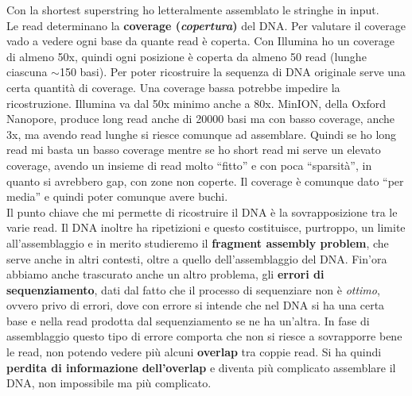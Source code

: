 \documentclass[a4paper,12pt, oneside]{book}
\begin{document}
Con la shortest superstring ho letteralmente assemblato le stringhe in input.\\
Le read determinano la \textbf{coverage (\textit{copertura})} del DNA. Per
valutare il coverage vado a vedere ogni base da quante read è coperta. Con
Illumina ho un coverage di almeno 50x, quindi ogni posizione è coperta da almeno
50 read (lunghe ciascuna $\sim$150 basi). Per poter ricostruire la sequenza di
DNA originale serve una certa quantità di coverage. Una coverage bassa potrebbe
impedire la ricostruzione. Illumina va dal 50x minimo anche a 80x.
MinION, della Oxford Nanopore, produce long read anche di 20000 basi ma con
basso coverage, anche 3x, ma avendo read lunghe si riesce comunque ad
assemblare. Quindi se ho long read mi basta un basso coverage mentre se ho short
read mi serve un elevato coverage, avendo un insieme di read molto ``fitto'' e
con poca ``sparsità'', in quanto si avrebbero gap, con zone non coperte. Il
coverage è comunque dato ``per media'' e quindi poter comunque avere buchi.\\
Il punto chiave che mi permette di ricostruire il DNA è la sovrapposizione tra
le varie read. Il DNA inoltre ha ripetizioni e questo costituisce, purtroppo, un
limite all'assemblaggio e in merito studieremo il \textbf{fragment assembly
  problem}, che serve anche in altri contesti, oltre a quello dell'assemblaggio
del DNA. Fin'ora abbiamo anche trascurato anche un altro problema, gli
\textbf{errori di sequenziamento}, dati dal fatto che il processo di sequenziare
non è \textit{ottimo}, ovvero privo di errori, dove con errore si intende che
nel DNA si ha una certa base e nella read prodotta dal sequenziamento se ne ha
un'altra. In fase di assemblaggio questo tipo di errore comporta che non si
riesce a sovrapporre bene le read, non potendo vedere più alcuni
\textbf{overlap} tra coppie read. Si ha quindi \textbf{perdita di informazione
  dell'overlap} e diventa più complicato assemblare il DNA, non impossibile ma
più complicato.
\end{document}
